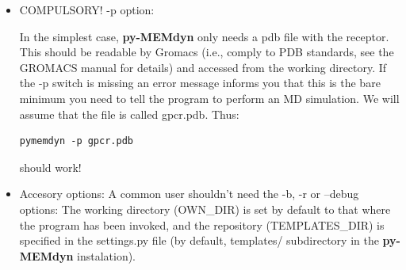 \documentclass[10pt, oneside, pdftex]{article}
\begin{document}
\begin{itemize}
\item{COMPULSORY! -p option:

In the  simplest case, \textbf{py-MEMdyn}  only needs a pdb  file with
the receptor.  This should be readable by Gromacs (i.e., comply to PDB
standards, see the  GROMACS manual for details) and  accessed from the
working  directory. If  the  -p  switch is  missing  an error  message
informs you that this is the bare minimum you need to tell the program
to perform  an MD simulation. We  will assume that the  file is called
gpcr.pdb.  Thus:
\begin{Verbatim}
pymemdyn -p gpcr.pdb
\end{Verbatim}
  should work!}

\item{Accesory options: 
A common user shouldn't need the -b,
  -r or  --debug options: The  working directory (OWN\_DIR) is  set by
  default  to  that  where  the  program has  been  invoked,  and  the
  repository  (TEMPLATES\_DIR) is  specified  in the  settings.py file  (by
  default,   templates/   subdirectory   in   the   \textbf{py-MEMdyn}
  instalation).}
  

\end{itemize}
\end{document}
